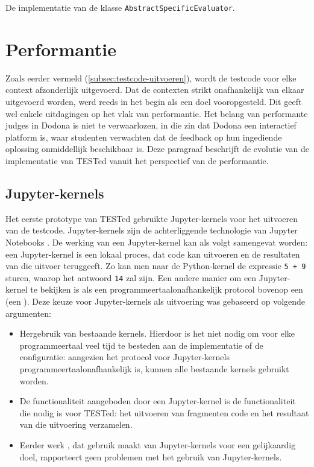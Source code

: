 \begin{listing}
    \inputminted{java}{../../judge/src/tested/languages/java/templates/AbstractSpecificEvaluator.java}
    \caption{De implementatie van de klasse \texttt{AbstractSpecificEvaluator}.}
    \label{lst:evaluation-java-specific}
\end{listing}

\section{Performantie}\label{sec:performantie}

Zoals eerder vermeld (\cref{subsec:testcode-uitvoeren}), wordt de testcode voor elke context afzonderlijk uitgevoerd.
Dat de contexten strikt onafhankelijk van elkaar uitgevoerd worden, werd reeds in het begin als een doel vooropgesteld.
Dit geeft wel enkele uitdagingen op het vlak van performantie.
Het belang van performante judges in Dodona is niet te verwaarlozen, in die zin dat Dodona een interactief platform is, waar studenten verwachten dat de feedback op hun ingediende oplossing onmiddellijk beschikbaar is.
Deze paragraaf beschrijft de evolutie van de implementatie van TESTed vanuit het perspectief van de performantie.

\subsection{Jupyter-kernels}\label{subsec:jupyter-kernels}

Het eerste prototype van TESTed gebruikte Jupyter-kernels voor het uitvoeren van de testcode.
Jupyter-kernels zijn de achterliggende technologie van Jupyter Notebooks \autocite{jupyter2016}.
De werking van een Jupyter-kernel kan als volgt samengevat worden: een Jupyter-kernel is een lokaal proces, dat code kan uitvoeren en de resultaten van die uitvoer teruggeeft.
Zo kan men naar de Python-kernel de expressie \texttt{5 + 9} sturen, waarop het antwoord \texttt{14} zal zijn.
Een andere manier om een Jupyter-kernel te bekijken is als een programmeertaalonafhankelijk protocol bovenop een  (een ).
Deze keuze voor Jupyter-kernels als uitvoering was gebaseerd op volgende argumenten:
\begin{itemize}
    \item Hergebruik van bestaande kernels.
    Hierdoor is het niet nodig om voor elke programmeertaal veel tijd te besteden aan de implementatie of de configuratie: aangezien het protocol voor Jupyter-kernels programmeertaalonafhankelijk is, kunnen alle bestaande kernels gebruikt worden.
    \item De functionaliteit aangeboden door een Jupyter-kernel is de functionaliteit die nodig is voor TESTed: het uitvoeren van fragmenten code en het resultaat van die uitvoering verzamelen.
    \item Eerder werk \autocite{petegem2018}, dat gebruik maakt van Jupyter-kernels voor een gelijkaardig doel, rapporteert geen problemen met het gebruik van Jupyter-kernels.
\end{itemize}

